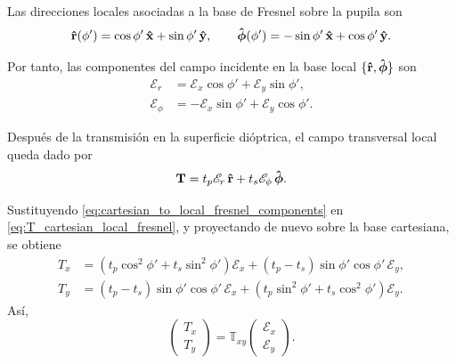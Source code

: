 Las direcciones locales asociadas a la base de Fresnel sobre la pupila son
\begin{equation}
\bm{\hat{\mathbf{r}}}(\phi')
=
\cos\phi'\,\bm{\hat{\mathbf{x}}}
+
\sin\phi'\,\bm{\hat{\mathbf{y}}},
\qquad
\bm{\hat{\mathbf{\phi}}}(\phi')
=
-\sin\phi'\,\bm{\hat{\mathbf{x}}}
+
\cos\phi'\,\bm{\hat{\mathbf{y}}}.
\label{eq:cartesian_polar_unit_vectors}
\end{equation}

Por tanto, las componentes del campo incidente en la base local
$\{\bm{\hat{\mathbf{r}}},\bm{\hat{\mathbf{\phi}}}\}$ son
\begin{equation}
\begin{aligned}
  \mathscr E_r
  &=
  \mathscr E_x\cos\phi'
  +
  \mathscr E_y\sin\phi',
  \\
  \mathscr E_\phi
  &=
  -
  \mathscr E_x\sin\phi'
  +
  \mathscr E_y\cos\phi'.
\end{aligned}
\label{eq:cartesian_to_local_fresnel_components}
\end{equation}

Después de la transmisión en la superficie dióptrica, el campo transversal local queda dado por
\begin{equation}
  \vb T
  =
  t_p\mathscr E_r\,\bm{\hat{\mathbf{r}}}
  +
  t_s\mathscr E_\phi\,\bm{\hat{\mathbf{\phi}}}.
\label{eq:T_cartesian_local_fresnel}
\end{equation}

Sustituyendo \eqref{eq:cartesian_to_local_fresnel_components} en
\eqref{eq:T_cartesian_local_fresnel}, y proyectando de nuevo sobre la base
cartesiana, se obtiene
\begin{equation}
\begin{aligned}
T_x
&=
\left(
t_p\cos^2\phi'
+
t_s\sin^2\phi'
\right)\mathscr E_x
+
\left(
t_p-t_s
\right)
\sin\phi'\cos\phi'\,\mathscr E_y,
\\
T_y
&=
\left(
t_p-t_s
\right)
\sin\phi'\cos\phi'\,\mathscr E_x
+
\left(
t_p\sin^2\phi'
+
t_s\cos^2\phi'
\right)\mathscr E_y.
\end{aligned}
\label{eq:Tx_Ty_before_trig_reduction}
\end{equation}
Así,
\begin{equation}
  \begin{pmatrix}
    T_x\\
    T_y
  \end{pmatrix}
  =
  \mathbb T_{xy}
  \begin{pmatrix}
    \mathscr E_x\\
    \mathscr E_y
  \end{pmatrix}.
\label{eq:T_cartesian_matrix_def}
\end{equation}

